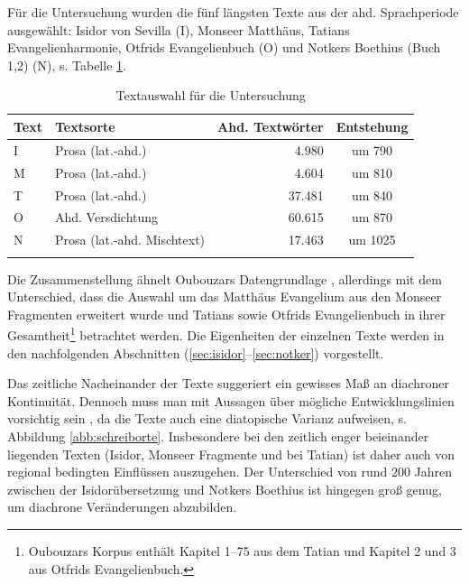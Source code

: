 Für die Untersuchung wurden die fünf längsten Texte aus der ahd. Sprachperiode ausgewählt: Isidor von Sevilla (I), Monseer Matthäus, Tatians Evangelienharmonie, Otfrids Evangelienbuch (O) und Notkers Boethius (Buch 1,2) (N), s. Tabelle \ref{tab:ddd-auswahl}. 
 
\begin{table}
\centering

\begin{tabular}{llrc}
\lsptoprule
Text                  & Textsorte      & Ahd. Textwörter & Entstehung \\ \midrule
I                      & Prosa (lat.-ahd.)          &   4.980                  & um 790       \\
M         & Prosa (lat.-ahd.)          & 4.604            & um 810              \\
T & Prosa (lat.-ahd.)          & 37.481                  & um 840              \\
O     & Ahd. Versdichtung          & 60.615               & um 870              \\
N   & Prosa (lat.-ahd. Mischtext) &  17.463               & um 1025             \\ \lspbottomrule
\end{tabular}
\caption{Textauswahl für die Untersuchung}
\label{tab:ddd-auswahl}
\end{table}


\noindent 
Die Zusammenstellung ähnelt Oubouzars Datengrundlage \parencite[41f.]{Oubouzar1989}, allerdings mit dem Unterschied, dass die Auswahl um das Matthäus Evangelium aus den Monseer Fragmenten erweitert wurde und Tatians sowie Otfrids Evangelienbuch in ihrer Gesamtheit\footnote{Oubouzars Korpus enthält Kapitel 1--75 aus dem Tatian und Kapitel 2 und 3 aus Otfrids Evangelienbuch.} betrachtet werden.  Die Eigenheiten der einzelnen Texte werden in den nachfolgenden Abschnitten (\ref{sec:isidor}--\ref{sec:notker}) vorgestellt. 

Das zeitliche Nacheinander der Texte suggeriert ein gewisses Maß an diachroner Kontinuität. Dennoch muss man mit Aussagen über mögliche Entwicklungslinien  vorsichtig sein \parencite[vgl. hierzu auch][158]{Leiss2000}, da die Texte auch eine diatopische Varianz aufweisen, s. Abbildung \ref{abb:schreiborte}. Insbesondere bei den zeitlich enger beieinander liegenden Texten (Isidor, Monseer Fragmente und bei Tatian) ist daher auch von regional bedingten Einflüssen auszugehen. Der Unterschied von rund 200 Jahren zwischen der Isidorübersetzung und Notkers Boethius ist hingegen groß genug, um diachrone Veränderungen abzubilden.


